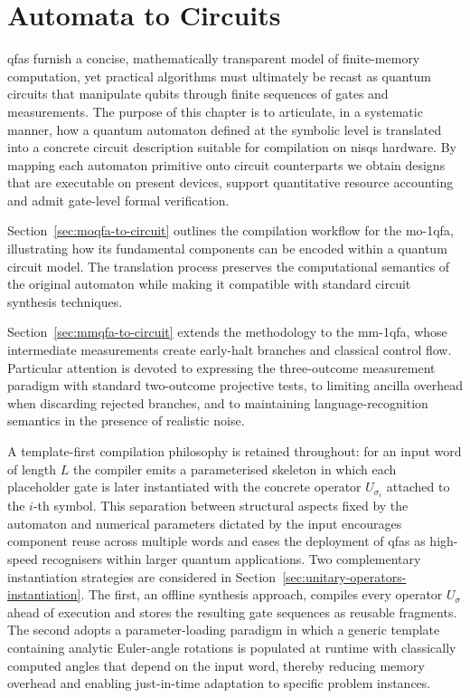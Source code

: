 \chapter{Automata to Circuits}
\label{chap:automata-to-circuits}
\noindent
\glspl{qfa} furnish a concise, mathematically transparent model of finite-memory computation, yet practical algorithms must ultimately be recast as quantum circuits that manipulate qubits through finite sequences of gates and measurements.  The purpose of this chapter is to articulate, in a systematic manner, how a quantum automaton defined at the symbolic level is translated into a concrete circuit description suitable for compilation on \glspl{nisq} hardware.  By mapping each automaton primitive onto circuit counterparts we obtain designs that are executable on present devices, support quantitative resource accounting and admit gate-level formal verification.

\medskip
\noindent
Section~\ref{sec:moqfa-to-circuit} outlines the compilation workflow for the \gls{mo-1qfa}, illustrating how its fundamental components can be encoded within a quantum circuit model.  The translation process preserves the computational semantics of the original automaton while making it compatible with standard circuit synthesis techniques.

\medskip
\noindent
Section~\ref{sec:mmqfa-to-circuit} extends the methodology to the \gls{mm-1qfa}, whose intermediate measurements create early-halt branches and classical control flow.  Particular attention is devoted to expressing the three-outcome measurement paradigm with standard two-outcome projective tests, to limiting ancilla overhead when discarding rejected branches, and to maintaining language-recognition semantics in the presence of realistic noise.

\medskip
\noindent
A template-first compilation philosophy is retained throughout: for an input word of length $L$ the compiler emits a parameterised skeleton in which each placeholder gate is later instantiated with the concrete operator $U_{\sigma_i}$ attached to the $i$-th symbol.  This separation between structural aspects fixed by the automaton and numerical parameters dictated by the input encourages component reuse across multiple words and eases the deployment of \glspl{qfa} as high-speed recognisers within larger quantum applications.  Two complementary instantiation strategies are considered in Section~\ref{sec:unitary-operators-instantiation}.  The first, an offline synthesis approach, compiles every operator $U_\sigma$ ahead of execution and stores the resulting gate sequences as reusable fragments.  The second adopts a parameter-loading paradigm in which a generic template containing analytic Euler-angle rotations is populated at runtime with classically computed angles that depend on the input word, thereby reducing memory overhead and enabling just-in-time adaptation to specific problem instances.

